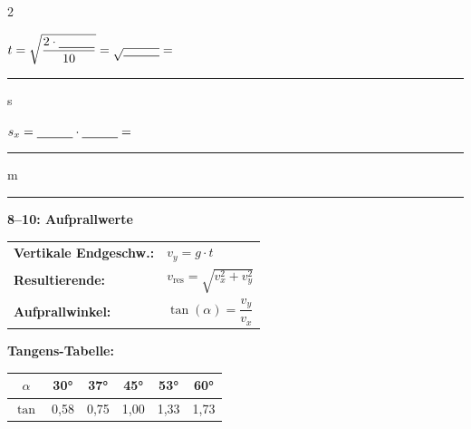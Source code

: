 \documentclass[10pt, a4paper]{article}
\newcommand{\fachfarbe}{physik}
\newcommand{\luecke}[1]{\rule[-2pt]{#1}{0.5pt}}
\newcommand{\schritt}[1]{%
    \vspace{4pt}
    \noindent\textcolor{\fachfarbe}{\rule{0.3cm}{0.3cm}}\hspace{4pt}\textbf{\textcolor{\fachfarbe}{#1}}
    \vspace{2pt}
}
\begin{document}
\begin{multicols}{2}
\begin{aufgabenbox}
\vspace{6pt}
$t = \sqrt{\dfrac{2 \cdot \luecke{1cm}}{10}} = \sqrt{\luecke{1cm}} = $ \luecke{1.2cm} s

\vspace{6pt}
$s_x = \luecke{1cm} \cdot \luecke{1cm} = $ \luecke{1.5cm} m
\end{aufgabenbox}

\vspace{6pt}


\schritt{8–10: Aufprallwerte}

\begin{formelbox}
\begin{tabular}{@{}ll@{}}
\textbf{Vertikale Endgeschw.:} & $v_y = g \cdot t$ \\[8pt]
\textbf{Resultierende:} & $v_{\text{res}} = \sqrt{v_x^2 + v_y^2}$ \\[8pt]
\textbf{Aufprallwinkel:} & $\tan(\alpha) = \dfrac{v_y}{v_x}$ \\
\end{tabular}
\end{formelbox}

\vspace{4pt}

\begin{center}
\end{center}

\vspace{2pt}

{\small\textbf{Tangens-Tabelle:}}

\begin{center}
\begin{tabular}{|c|c|c|c|c|c|}
\hline
$\alpha$ & 30° & 37° & 45° & 53° & 60° \\
\hline
$\tan$ & 0,58 & 0,75 & 1,00 & 1,33 & 1,73 \\
\hline
\end{tabular}
\end{center}


\end{multicols}
\end{document}
